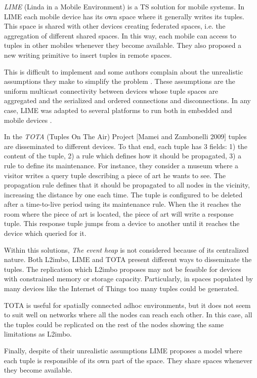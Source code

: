 \emph{LIME} (Linda in a Mobile Environment) \cite{picco_lime:_1999} is a TS solution for mobile systems.
In LIME each mobile device has its own space where it generally writes its tuples.
This space is shared with other devices creating federated spaces, i.e. the aggregation of different shared spaces.
In this way, each mobile can access to tuples in other mobiles whenever they become available.
They also proposed a new writing primitive to insert tuples in remote spaces.

This is difficult to implement and some authors complain about the unrealistic assumptions they make to simplify the problem \cite{coulouris_distributed_2012}. %
These assumptions are the uniform multicast connectivity between devices whose tuple spaces are aggregated and the serialized and ordered connections and disconnections.
In any case, LIME was adapted to several platforms to run both in embedded and mobile devices \cite{murphy_transiently_2006}.


In the \emph{TOTA} (Tuples On The Air) Project [Mamei and Zambonelli 2009] tuples are disseminated to different devices. %
To that end, each tuple has 3 fields:
1) the content of the tuple,
2) a rule which defines how it should be propagated,
3) a rule to define its maintenance.
For instance, they consider a museum where a visitor writes a query tuple describing a piece of art he wants to see.
The propagation rule defines that it should be propagated to all nodes in the vicinity, increasing the distance by one each time.
The tuple is configured to be deleted after a time-to-live period using its maintenance rule.
When the it reaches the room where the piece of art is located, the piece of art will write a response tuple.
This response tuple jumps from a device to another until it reaches the device which queried for it.


\bigskip


Within this solutions, \emph{The event heap} is not considered because of its centralized nature.
Both L2imbo, LIME and TOTA present different ways to disseminate the tuples.
The replication which L2imbo proposes may not be feasible for devices with constrained memory or storage capacity.
Particularly, in spaces populated by many devices like the Internet of Things too many tuples could be generated.

TOTA is useful for spatially connected adhoc environments, but it does not seem to suit well on networks where all the nodes can reach each other.
In this case, all the tuples could be replicated on the rest of the nodes showing the same limitations as L2imbo.%

Finally, despite of their unrealistic assumptions LIME proposes a model where each tuple is responsible of its own part of the space.
They share spaces whenever they become available.


